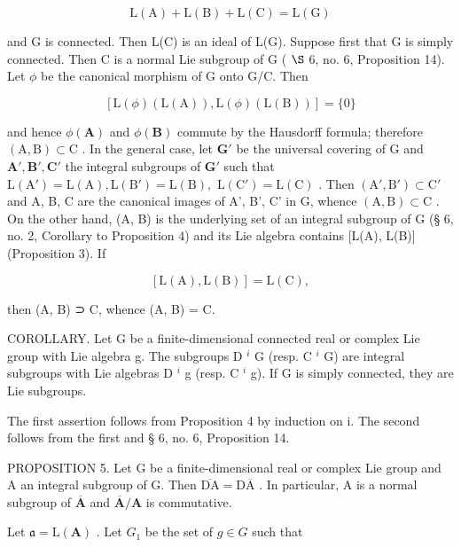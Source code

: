 \[
\mathrm{L} (\mathrm{A}) + \mathrm{L} (\mathrm{B}) + \mathrm{L} (\mathrm{C}) = \mathrm{L} (\mathrm{G})
\]

and G is connected. Then L(C) is an ideal of L(G). Suppose first that G is simply connected. Then C is a normal Lie subgroup of G ( \(\S\) 6, no. 6, Proposition 14). Let \(\phi\) be the canonical morphism of G onto G/C. Then

\[
[ \mathrm{L} (\phi) (\mathrm{L} (\mathrm{A})), \mathrm{L} (\phi) (\mathrm{L} (\mathrm{B})) ] = \{0 \}
\]

and hence \(\phi (\mathbf{A})\) and \(\phi (\mathbf{B})\) commute by the Hausdorff formula; therefore \((\mathrm{A},\mathrm{B})\subset \mathrm{C}\) . In the general case, let \(\mathbf{G}'\) be the universal covering of G and \(\mathbf{A}',\mathbf{B}',\mathbf{C}'\) the integral subgroups of \(\mathbf{G}'\) such that \(\mathrm{L}(\mathrm{A}') = \mathrm{L}(\mathrm{A}),\mathrm{L}(\mathrm{B}') = \mathrm{L}(\mathrm{B}),\) \(\mathrm{L}(\mathrm{C}') = \mathrm{L}(\mathrm{C})\) . Then \((\mathrm{A}',\mathrm{B}')\subset \mathrm{C}'\) and A, B, C are the canonical images of A', B', C' in G, whence \((\mathrm{A},\mathrm{B})\subset \mathrm{C}\) . On the other hand, (A, B) is the underlying set of an integral subgroup of G (§ 6, no. 2, Corollary to Proposition 4) and its Lie algebra contains [L(A), L(B)] (Proposition 3). If

\[
[ \mathrm{L} (\mathrm{A}), \mathrm{L} (\mathrm{B}) ] = \mathrm{L} (\mathrm{C}),
\]

then (A, B) ⊃ C, whence (A, B) = C.

COROLLARY. Let G be a finite-dimensional connected real or complex Lie group with Lie algebra g. The subgroups D \(^{i}\) G (resp. C \(^{i}\) G) are integral subgroups with Lie algebras D \(^{i}\) g (resp. C \(^{i}\) g). If G is simply connected, they are Lie subgroups.

The first assertion follows from Proposition 4 by induction on i. The second follows from the first and § 6, no. 6, Proposition 14.

PROPOSITION 5. Let G be a finite-dimensional real or complex Lie group and A an integral subgroup of G. Then \(\overline{\mathrm{D}\mathrm{A}} = \mathrm{D}\overline{\mathrm{A}}\) . In particular, A is a normal subgroup of \(\overline{\mathbf{A}}\) and \(\overline{\mathbf{A}} / \mathbf{A}\) is commutative.

Let \(\mathfrak{a} = \mathrm{L}(\mathbf{A})\) . Let \(G_{1}\) be the set of \(g \in G\) such that

